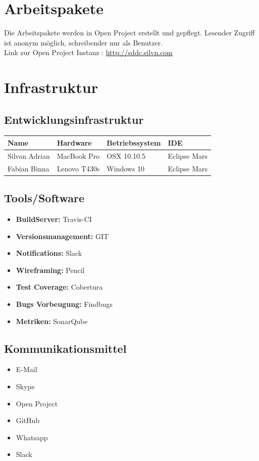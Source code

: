\section{Arbeitspakete}

Die Arbeitspakete werden in Open Project erstellt und gepflegt.
Lesender Zugriff ist anonym möglich, schreibender nur als Benutzer. 
\\
Link zur Open Project Instanz : \href{http://sddc.silvn.com}{http://sddc.silvn.com}

\section{Infrastruktur}

\subsection{Entwicklungsinfrastruktur}

\begin{tabularx}{\textwidth}{X X X X}
\textbf{Name} & \textbf{Hardware} & \textbf{Betriebssystem} & \textbf{IDE} \\
\hline
Silvan Adrian & MacBook Pro & OSX 10.10.5 &  Eclipse Mars \\
\hline
Fabian Binna & Lenovo T430s & Windows 10 &  Eclipse Mars\\
\hline
\end{tabularx}

\subsection{Tools/Software}
\begin{itemize}
    \item \textbf{BuildServer:} Travis-CI
    \item \textbf{Versionsmanagement:} GIT
    \item \textbf{Notifications:} Slack
    \item \textbf{Wireframing:} Pencil
    \item \textbf{Test Coverage:} Cobertura
    \item \textbf{Bugs Vorbeugung:} Findbugs
    \item \textbf{Metriken:} SonarQube
\end{itemize}

\subsection{Kommunikationsmittel}
\begin{itemize}
    \item E-Mail
    \item Skype
    \item Open Project
    \item GitHub
    \item Whatsapp
    \item Slack
\end{itemize}

